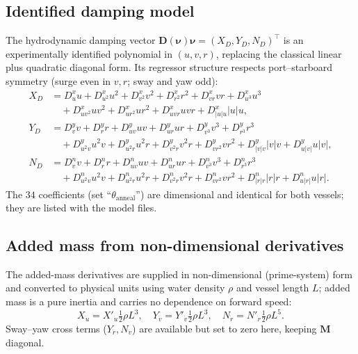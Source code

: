 \documentclass[11pt]{article}
\newcommand{\nuv}{\boldsymbol{\nu}}
\begin{document}
\subsection{Identified damping model}
The hydrodynamic damping vector $\mathbf{D}(\nuv)\nuv=(X_D,Y_D,N_D)^{\top}$ is an
experimentally identified polynomial in $(u,v,r)$, replacing the classical linear
plus quadratic diagonal form. Its regressor structure respects port--starboard
symmetry (surge even in $v,r$; sway and yaw odd):
\begin{align}
X_D &= D^{x}_{u}u + D^{x}_{u^2}u^2 + D^{x}_{v^2}v^2 + D^{x}_{r^2}r^2
     + D^{x}_{vr}vr + D^{x}_{u^3}u^3 \nonumber\\
    &\quad + D^{x}_{uv^2}uv^2 + D^{x}_{ur^2}ur^2 + D^{x}_{uvr}uvr + D^{x}_{|u|u}|u|u,\\
Y_D &= D^{y}_{v}v + D^{y}_{r}r + D^{y}_{uv}uv + D^{y}_{ur}ur + D^{y}_{v^3}v^3
     + D^{y}_{r^3}r^3 \nonumber\\
    &\quad + D^{y}_{u^2v}u^2v + D^{y}_{u^2r}u^2r + D^{y}_{v^2r}v^2r
     + D^{y}_{vr^2}vr^2 + D^{y}_{|v|v}|v|v + D^{y}_{u|v|}u|v|,\\
N_D &= D^{n}_{v}v + D^{n}_{r}r + D^{n}_{uv}uv + D^{n}_{ur}ur + D^{n}_{v^3}v^3
     + D^{n}_{r^3}r^3 \nonumber\\
    &\quad + D^{n}_{u^2v}u^2v + D^{n}_{u^2r}u^2r + D^{n}_{v^2r}v^2r
     + D^{n}_{vr^2}vr^2 + D^{n}_{|r|r}|r|r + D^{n}_{u|r|}u|r|.
\end{align}
The $34$ coefficients (set ``$\theta_{\mathrm{anneal}}$'') are dimensional and
identical for both vessels; they are listed with the model files.

\subsection{Added mass from non-dimensional derivatives}
The added-mass derivatives are supplied in non-dimensional (prime-system) form and
converted to physical units using water density $\rho$ and vessel length $L$; added
mass is a pure inertia and carries no dependence on forward speed:
\begin{equation}
X_{\dot u}=X'_{\dot u}\tfrac12\rho L^3,\quad
Y_{\dot v}=Y'_{\dot v}\tfrac12\rho L^3,\quad
N_{\dot r}=N'_{\dot r}\tfrac12\rho L^5 .
\end{equation}
Sway--yaw cross terms ($Y_{\dot r},N_{\dot v}$) are available but set to zero here,
keeping $\mathbf{M}$ diagonal.

\end{document}
